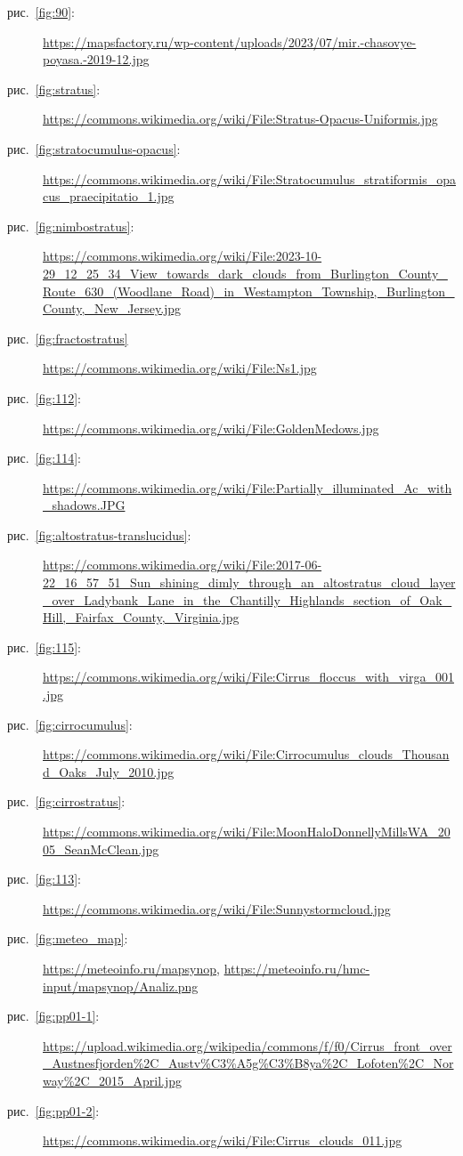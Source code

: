 \documentclass[a4paper, 12pt, twoside, final, book, russian, fittopage, cyremdash, openright]{ncc}
\newcommand{\rris}[1]{рис.~\ref{fig:#1}}
\begin{document}
\begin{description}
\item [\rris{90}:] \url{https://mapsfactory.ru/wp-content/uploads/2023/07/mir.-chasovye-poyasa.-2019-12.jpg}
\item [\rris{stratus}:] \url{https://commons.wikimedia.org/wiki/File:Stratus-Opacus-Uniformis.jpg}
\item [\rris{stratocumulus-opacus}:]  \url{https://commons.wikimedia.org/wiki/File:Stratocumulus_stratiformis_opacus_praecipitatio_1.jpg}
\item [\rris{nimbostratus}:] \url{https://commons.wikimedia.org/wiki/File:2023-10-29_12_25_34_View_towards_dark_clouds_from_Burlington_County_Route_630_(Woodlane_Road)_in_Westampton_Township,_Burlington_County,_New_Jersey.jpg}
\item [\rris{fractostratus}] \url{https://commons.wikimedia.org/wiki/File:Ns1.jpg}
\item [\rris{112}:] \url{https://commons.wikimedia.org/wiki/File:GoldenMedows.jpg}
\item [\rris{114}:] \url{https://commons.wikimedia.org/wiki/File:Partially_illuminated_Ac_with_shadows.JPG}
\item[\rris{altostratus-translucidus}:] \url{https://commons.wikimedia.org/wiki/File:2017-06-22_16_57_51_Sun_shining_dimly_through_an_altostratus_cloud_layer_over_Ladybank_Lane_in_the_Chantilly_Highlands_section_of_Oak_Hill,_Fairfax_County,_Virginia.jpg}
\item[\rris{115}:] \url{https://commons.wikimedia.org/wiki/File:Cirrus_floccus_with_virga_001.jpg}
\item[\rris{cirrocumulus}:] \url{https://commons.wikimedia.org/wiki/File:Cirrocumulus_clouds_Thousand_Oaks_July_2010.jpg}
\item[\rris{cirrostratus}:] \url{https://commons.wikimedia.org/wiki/File:MoonHaloDonnellyMillsWA_2005_SeanMcClean.jpg}
\item[\rris{113}:] \url{https://commons.wikimedia.org/wiki/File:Sunnystormcloud.jpg}
\item[\rris{meteo_map}:] \url{https://meteoinfo.ru/mapsynop}, \url{https://meteoinfo.ru/hmc-input/mapsynop/Analiz.png}
\item[\rris{pp01-1}:] \url{https://upload.wikimedia.org/wikipedia/commons/f/f0/Cirrus_front_over_Austnesfjorden%2C_Austv%C3%A5g%C3%B8ya%2C_Lofoten%2C_Norway%2C_2015_April.jpg}
\item[\rris{pp01-2}:] \url{https://commons.wikimedia.org/wiki/File:Cirrus_clouds_011.jpg}
\end{description}
\end{document}
